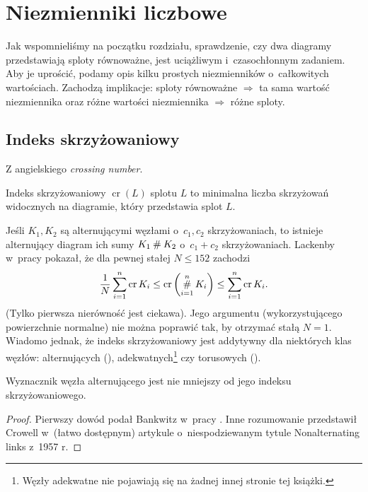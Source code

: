 \section{Niezmienniki liczbowe}
Jak wspomnieliśmy na początku rozdziału, sprawdzenie,
czy dwa diagramy przedstawiają sploty równoważne,
jest uciążliwym i~czasochłonnym zadaniem.
Aby je uprościć, podamy opis kilku prostych niezmienników o~całkowitych wartościach.
Zachodzą implikacje:
sploty równoważne $\Rightarrow$ ta sama wartość niezmiennika
oraz różne wartości niezmiennika $\Rightarrow$ różne sploty.

\subsection{Indeks skrzyżowaniowy} %
\label{sub:crossing_number}
Z angielskiego \emph{crossing number}.

\begin{definition}
    Indeks skrzyżowaniowy $\operatorname{cr}(L)$ splotu $L$ to
    minimalna liczba skrzyżowań widocznych na diagramie,
    który przedstawia splot $L$.
\end{definition}

Jeśli $K_1, K_2$ są alternującymi węzłami o~$c_1, c_2$ skrzyżowaniach, to istnieje alternujący diagram ich sumy $K_1 \mathbin{\#} K_2$ o~$c_1 + c_2$ skrzyżowaniach.
Lackenby w~pracy \cite{lackenby09} pokazał, że dla pewnej stałej $N \le 152$ zachodzi
\[
    \frac 1 N \sum_{i=1}^n \operatorname{cr} K_i \le \operatorname{cr} \left(\operatorname*{\#}_{i=1}^n K_i\right) \le \sum_{i=1}^n \operatorname{cr} K_i.
\]
(Tylko pierwsza nierówność jest ciekawa).
Jego argumentu (wykorzystującego powierzchnie normalne) nie można poprawić tak, by otrzymać stałą $N = 1$.
Wiadomo jednak, że indeks skrzyżowaniowy jest addytywny dla niektórych klas węzłów: alternujących (\cite{kauffman88}), adekwatnych\footnote{Węzły adekwatne nie pojawiają się na żadnej innej stronie tej książki.} czy torusowych (\cite{gruber03}).

\begin{theorem}[Bankwitz, 1930] \label{thm:bankwitz}
    Wyznacznik węzła alternującego jest nie mniejszy od jego indeksu skrzyżowaniowego.
\end{theorem}

\begin{proof}
    Pierwszy dowód podał Bankwitz w~pracy \cite{bankwitz30}.
    Inne rozumowanie przedstawił Crowell w~(łatwo dostępnym) artykule o~niespodziewanym tytule Nonalternating links z~1957 r.
\end{proof}


